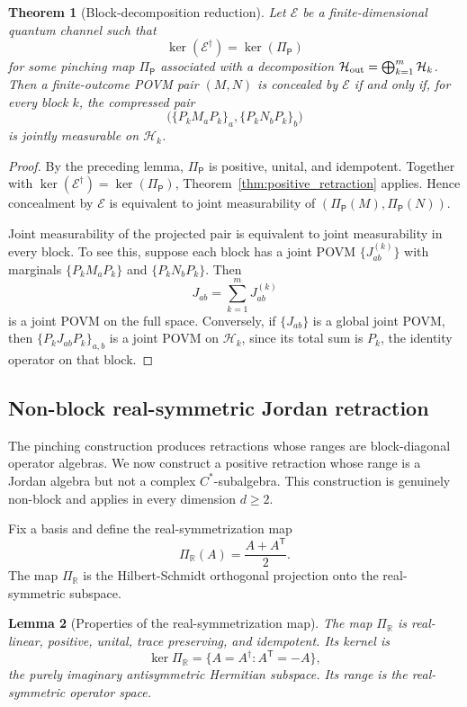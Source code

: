 \documentclass[
aps,pra,twocolumn,10pt,
superscriptaddress,longbibliography,floatfix
]{revtex4-2}
\newtheorem{theorem}{Theorem}[section]
\newtheorem{lemma}[theorem]{Lemma}
\begin{document}
\begin{theorem}[Block-decomposition reduction]
\label{thm:block_reduction}
Let $\mathcal E$ be a finite-dimensional quantum channel such that
\[
\ker(\mathcal E^\dagger)=\ker(\Pi_{\mathsf P})
\]
for some pinching map $\Pi_{\mathsf P}$ associated with a decomposition $\mathcal H_{\rm out}=\bigoplus_{k=1}^m\mathcal H_k$. Then a finite-outcome POVM pair $(M,N)$ is concealed by $\mathcal E$ if and only if, for every block $k$, the compressed pair
\[
\bigl(
\{P_k M_a P_k\}_a,
\{P_k N_b P_k\}_b
\bigr)
\]
is jointly measurable on $\mathcal H_k$.
\end{theorem}

\begin{proof}
By the preceding lemma, $\Pi_{\mathsf P}$ is positive, unital, and idempotent. Together with $\ker(\mathcal E^\dagger)=\ker(\Pi_{\mathsf P})$, Theorem~\ref{thm:positive_retraction} applies. Hence concealment by $\mathcal E$ is equivalent to joint measurability of $(\Pi_{\mathsf P}(M),\Pi_{\mathsf P}(N))$.

Joint measurability of the projected pair is equivalent to joint measurability in every block. To see this, suppose each block has a joint POVM $\{J^{(k)}_{ab}\}$ with marginals $\{P_k M_a P_k\}$ and $\{P_k N_b P_k\}$. Then
\[
J_{ab}=\sum_{k=1}^m J^{(k)}_{ab}
\]
is a joint POVM on the full space. Conversely, if $\{J_{ab}\}$ is a global joint POVM, then $\{P_k J_{ab}P_k\}_{a,b}$ is a joint POVM on $\mathcal H_k$, since its total sum is $P_k$, the identity operator on that block.
\end{proof}

\subsection{Non-block real-symmetric Jordan retraction}

The pinching construction produces retractions whose ranges are block-diagonal operator algebras. We now construct a positive retraction whose range is a Jordan algebra but not a complex $C^*$-subalgebra. This construction is genuinely non-block and applies in every dimension $d\ge2$.

Fix a basis and define the real-symmetrization map
\[
\Pi_{\mathbb R}(A)=\frac{A+A^{\mathsf T}}{2}.
\]
The map $\Pi_{\mathbb R}$ is the Hilbert-Schmidt orthogonal projection onto the real-symmetric subspace.

\begin{lemma}[Properties of the real-symmetrization map]
The map $\Pi_{\mathbb R}$ is real-linear, positive, unital, trace preserving, and idempotent. Its kernel is
\[
\ker\Pi_{\mathbb R}
=
\{A=A^\dagger : A^{\mathsf T}=-A\},
\]
the purely imaginary antisymmetric Hermitian subspace. Its range is the real-symmetric operator space.
\end{lemma}
\end{document}
